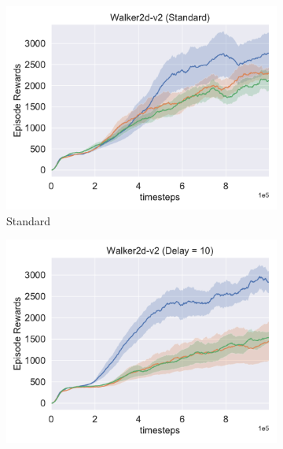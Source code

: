 \begin{figure}[h!]
\centering
  \begin{subfigure}[t]{0.49\textwidth}
    \includegraphics[width=\textwidth]{figures/chapter5/embedding/delay1.pdf}
    \caption{Standard}
  \end{subfigure}\hfill
  \begin{subfigure}[t]{0.49\textwidth}
    \includegraphics[width=\textwidth]{figures/chapter5/embedding/delay10.pdf}

\end{subfigure}
\end{figure}
